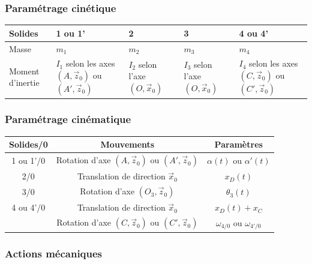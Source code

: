\subsubsection*{Paramétrage cinétique}

\begin{center}
\begin{tabular}{|m{2cm}|m{3cm}|m{3cm}|m{3cm}|m{3cm}|}
    \hline
    Solides & 1 ou 1' & 2 & 3 & 4 ou 4' \\
    \hline
    Masse & $m_1$ & $m_2$ & $m_3$ & $m_4$ \\
    \hline
    Moment d'inertie & $I_1$ selon les axes $(A, \vec{z}_0)$ ou $(A', \vec{z}_0)$ & $I_2$ selon l'axe $(O, \vec{x}_0)$ & $I_3$ selon l'axe $(O, \vec{x}_0)$ & $I_4$ selon les axes $(C, \vec{z}_0)$ ou $(C', \vec{z}_0)$ \\
    \hline
\end{tabular}
\end{center}

\subsubsection*{Paramétrage cinématique}

\begin{center}
\begin{tabular}{|c|c|c|}
    \hline
    Solides/0 & Mouvements & Paramètres \\
    \hline
    1 ou 1'/0 & Rotation d'axe $(A, \vec{z}_0)$ ou $(A', \vec{z}_0)$ & $\alpha(t)$ ou $\alpha'(t)$ \\
    \hline
    2/0 & Translation de direction $\vec{x}_0$ & $x_D(t)$ \\
    \hline
    3/0 & Rotation d'axe $(O_3, \vec{z}_0)$ & $\theta_3(t)$ \\
    \hline
    4 ou 4'/0 & Translation de direction $\vec{x}_0$ & $x_D(t) + x_C$ \\
    & Rotation d'axe $(C, \vec{z}_0)$ ou $(C', \vec{z}_0)$ & $\omega_{4/0}$ ou $\omega_{4'/0}$ \\
    \hline
\end{tabular}
\end{center}

\subsubsection*{Actions mécaniques}


